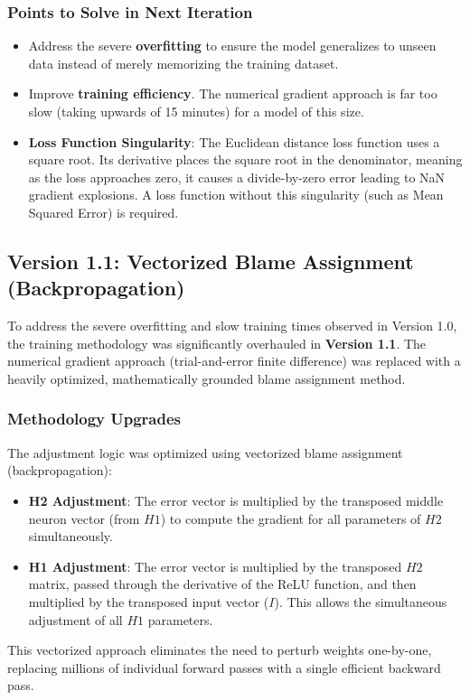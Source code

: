 \documentclass[12pt,a4paper]{article}
\begin{document}
\subsubsection{Points to Solve in Next Iteration}
\begin{itemize}
    \item Address the severe \textbf{overfitting} to ensure the model generalizes to unseen data instead of merely memorizing the training dataset.
    \item Improve \textbf{training efficiency}. The numerical gradient approach is far too slow (taking upwards of 15 minutes) for a model of this size.
    \item \textbf{Loss Function Singularity}: The Euclidean distance loss function uses a square root. Its derivative places the square root in the denominator, meaning as the loss approaches zero, it causes a divide-by-zero error leading to NaN gradient explosions. A loss function without this singularity (such as Mean Squared Error) is required.
\end{itemize}

\subsection{Version 1.1: Vectorized Blame Assignment (Backpropagation)}
To address the severe overfitting and slow training times observed in Version 1.0, the training methodology was significantly overhauled in \textbf{Version 1.1}. The numerical gradient approach (trial-and-error finite difference) was replaced with a heavily optimized, mathematically grounded blame assignment method.

\subsubsection{Methodology Upgrades}
The adjustment logic was optimized using vectorized blame assignment (backpropagation):
\begin{itemize}
    \item \textbf{H2 Adjustment}: The error vector is multiplied by the transposed middle neuron vector (from $H1$) to compute the gradient for all parameters of $H2$ simultaneously.
    \item \textbf{H1 Adjustment}: The error vector is multiplied by the transposed $H2$ matrix, passed through the derivative of the ReLU function, and then multiplied by the transposed input vector ($I$). This allows the simultaneous adjustment of all $H1$ parameters.
\end{itemize}
This vectorized approach eliminates the need to perturb weights one-by-one, replacing millions of individual forward passes with a single efficient backward pass.
\end{document}
